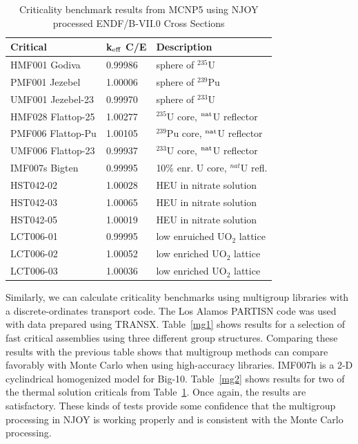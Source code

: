 \begin{table}[thbp]
\caption[Criticality benchmark results from MCNP5 with NJOY processed \newline
 ENDF/B-VII.0 data]{Criticality benchmark results from MCNP5 using NJOY
 processed ENDF/B-VII.0 Cross Sections}
\setlength{\extrarowheight}{1pt}
\begin{center}
\begin{tabular}{lll}
Critical & k$_{\rm eff}$ C/E & Description \\ \hline
HMF001 Godiva & 0.99986 & sphere of $^{235}$U \\
PMF001 Jezebel & 1.00006 & sphere of $^{239}$Pu \\
UMF001 Jezebel-23 & 0.99970 & sphere of $^{233}$U \\
HMF028 Flattop-25 & 1.00277 & $^{235}$U core, $^{\rm nat}$U reflector \\
PMF006 Flattop-Pu & 1.00105 & $^{239}$Pu core, $^{\rm nat}$U reflector \\
UMF006 Flattop-23 & 0.99937 & $^{233}$U core, $^{\rm nat}$U reflector \\
IMF007s Bigten & 0.99995 & 10\% enr. U core, $^{nat}$U refl. \\
HST042-02 & 1.00028 & HEU in nitrate solution \\
HST042-03 & 1.00065 & HEU in nitrate solution \\
HST042-05 & 1.00019 & HEU in nitrate solution \\
LCT006-01 & 0.99995 & low enruiched UO$_2$ lattice \\
LCT006-02 & 1.00052 & low enriched UO$_2$ lattice \\
LCT006-03 & 1.00036 & low enriched UO$_2$ lattice \\ \hline
\end{tabular}
\end{center}
\label{crits1}
\end{table}

Similarly, we can calculate criticality benchmarks using
multigroup libraries with a discrete-ordinates transport
code.  The Los Alamos PARTISN code was used with data
prepared using TRANSX.  Table~\ref{mg1} shows results for a
selection of fast critical assemblies using three different
group structures.  Comparing these results with the previous
table shows that multigroup methods can compare favorably
with Monte Carlo when using high-accuracy libraries.
IMF007h is a 2-D cyclindrical homogenized model for
Big-10.  Table~\ref{mg2} shows results for two of the thermal
solution criticals from Table~\ref{crits1}.  Once again, the
results are satisfactory.  These kinds of tests provide some
confidence that the multigroup processing in NJOY is working
properly and is consistent with the Monte Carlo processing.

